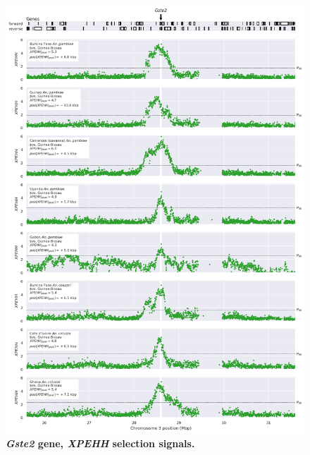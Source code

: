 \documentclass[a4paper,11pt,abstracton,hidelinks]{scrartcl}
\begin{document}
\begin{figure}[t!]
	\begin{center}
		\includegraphics*[width=1\linewidth,center]{artwork/locus_gste2_xpehh_pdist.png}
	\end{center}
	\caption[\textit{Gste2} gene, \textit{XPEHH} selection signals]{
	\textbf{\textit{Gste2} gene, \textit{XPEHH} selection signals.}
	} 
	\label{fig:locus_gste2_xpehh}
\end{figure}
\end{document}
